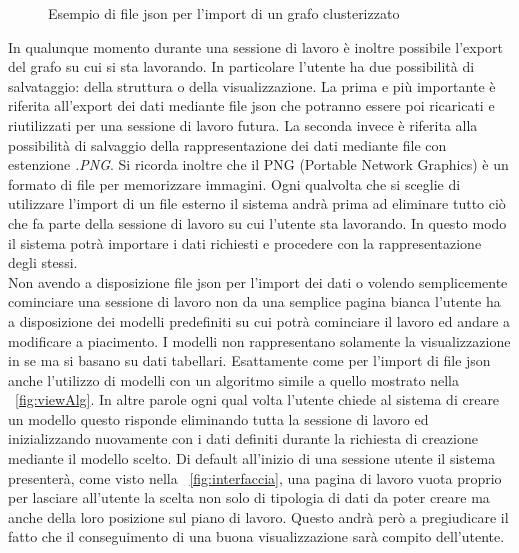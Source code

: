 {\begin{figure}[!htb]
\begin{center}
	\end{center}
	\caption{Esempio di file json per l'import di un grafo clusterizzato \label{fig:json}}
\end{figure}
\newline
In qualunque momento durante una sessione di lavoro è inoltre possibile l'export del grafo su cui si sta lavorando. In particolare l'utente ha due possibilità di salvataggio: della struttura o della visualizzazione. La prima e più importante è riferita all'export dei dati mediante file json che potranno essere poi ricaricati e riutilizzati per una sessione di lavoro futura. La seconda invece è riferita alla possibilità di salvaggio della rappresentazione dei dati mediante file con estenzione \textit{.PNG}. Si ricorda inoltre che il PNG (Portable Network Graphics) è un formato di file per memorizzare immagini. 
Ogni qualvolta che si sceglie di utilizzare l'import di un file esterno il sistema andrà prima ad eliminare tutto ciò che fa parte della sessione di lavoro su cui l'utente sta lavorando. In questo modo il sistema potrà importare i dati richiesti e procedere con la rappresentazione degli stessi.\\
Non avendo a disposizione file json per l'import dei dati o volendo semplicemente cominciare una sessione di lavoro non da una semplice pagina bianca l'utente ha a disposizione dei modelli predefiniti su cui potrà cominciare il lavoro ed andare a modificare a piacimento. I modelli non rappresentano solamente la visualizzazione in se ma si basano su dati tabellari. Esattamente come per l'import di file json anche l'utilizzo di modelli con un algoritmo simile a quello mostrato nella \figurename~\ref{fig:viewAlg}. In altre parole ogni qual volta l'utente chiede al sistema di creare un modello questo risponde eliminando tutta la sessione di lavoro ed inizializzando nuovamente con i dati definiti durante la richiesta di creazione mediante il modello scelto. Di default all'inizio di una sessione utente il sistema presenterà, come visto nella \figurename~\ref{fig:interfaccia}, una pagina di lavoro vuota proprio per lasciare all'utente la scelta non solo di tipologia di dati da poter creare ma anche della loro posizione sul piano di lavoro. Questo andrà però a pregiudicare il fatto che il conseguimento di una buona visualizzazione sarà compito dell'utente.\\
}
